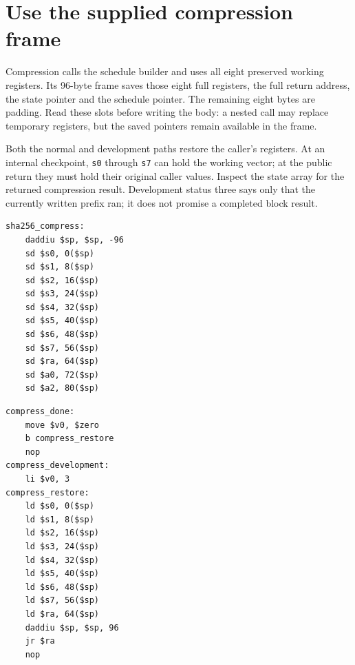 \section{Use the supplied compression frame}
Compression calls the schedule builder and uses all eight preserved working registers.
Its 96-byte frame saves those eight full registers, the full return address, the state
pointer and the schedule pointer. The remaining eight bytes are padding. Read these
slots before writing the body: a nested call may replace temporary registers, but the
saved pointers remain available in the frame.

Both the normal and development paths restore the caller's registers. At an internal
checkpoint, \texttt{s0} through \texttt{s7} can hold the working vector; at the public
return they must hold their original caller values. Inspect the state array for the
returned compression result. Development status three says only that the currently
written prefix ran; it does not promise a completed block result.

\begin{verbatim}
sha256_compress:
    daddiu $sp, $sp, -96
    sd $s0, 0($sp)
    sd $s1, 8($sp)
    sd $s2, 16($sp)
    sd $s3, 24($sp)
    sd $s4, 32($sp)
    sd $s5, 40($sp)
    sd $s6, 48($sp)
    sd $s7, 56($sp)
    sd $ra, 64($sp)
    sd $a0, 72($sp)
    sd $a2, 80($sp)
\end{verbatim}

\begin{verbatim}
compress_done:
    move $v0, $zero
    b compress_restore
    nop
compress_development:
    li $v0, 3
compress_restore:
    ld $s0, 0($sp)
    ld $s1, 8($sp)
    ld $s2, 16($sp)
    ld $s3, 24($sp)
    ld $s4, 32($sp)
    ld $s5, 40($sp)
    ld $s6, 48($sp)
    ld $s7, 56($sp)
    ld $ra, 64($sp)
    daddiu $sp, $sp, 96
    jr $ra
    nop

\end{verbatim}
